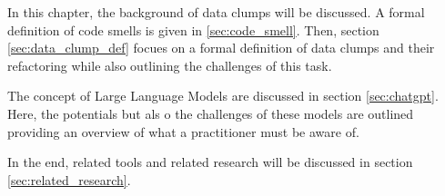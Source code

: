 

In this chapter, the background of data clumps will be discussed. A formal definition of code smells is given in \ref{sec:code_smell}. Then, section \ref{sec:data_clump_def} focues on a formal definition of data clumps and their refactoring while also outlining the challenges of this task.

The concept of Large Language Models are discussed in section \ref{sec:chatgpt}. Here, the potentials but als o the challenges of these models are outlined providing an overview of what a practitioner must be aware of.

In the end, related tools and related research will be discussed in section \ref{sec:related_research}. 








\begin{comment}
\section{Related work}
Since refactoring code smells is becoming increasingly important for developers, a variety of research has been conducted to study how the refactoring process can be improved.

Furthermore, tools have been developed that on their own cannot refactor code smells but can be adapted and used to ease developing refactoring tools.

Additionally, the use of \ac{LLM} in software development has recently gained widespread attention and has become a focus of several studies which analyzes the potential and challenges in practice. 

\subsection{Tools to assists data clump refactoring}





\end{comment}